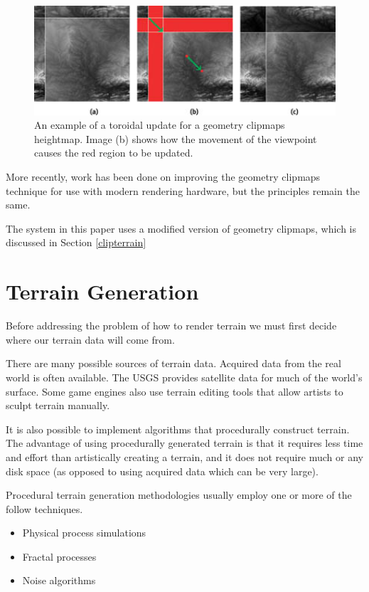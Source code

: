 \begin{figure}
	\centering
		\includegraphics[width=1.0\textwidth]{figures/clipmaps_update.jpg}
	\caption{
		An example of a toroidal update for a geometry clipmaps heightmap.
		Image (b) shows how the movement of the viewpoint causes the red region to be updated.
	}
	\label{fig:clipmaps_update}
\end{figure}

More recently, work has been done on improving the geometry clipmaps technique for use with modern rendering hardware, but the principles remain the same. \cite{gems_clipmaps}

The system in this paper uses a modified version of geometry clipmaps, which is discussed in Section \ref{clipterrain}

\section{Terrain Generation} \label{terrain_gen}

Before addressing the problem of how to render terrain we must first decide where our terrain data will come from.

There are many possible sources of terrain data.
Acquired data from the real world is often available.
The USGS provides satellite data for much of the world's surface.
Some game engines also use terrain editing tools that allow artists to sculpt terrain manually.

It is also possible to implement algorithms that procedurally construct terrain.
The advantage of using procedurally generated terrain is that it requires less time and effort  than artistically creating a terrain, and it does not require much or any disk space (as opposed to using acquired data which can be very large).

Procedural terrain generation methodologies usually employ one or more of the follow techniques.

\begin{itemize}
\item Physical process simulations
\item Fractal processes
\item Noise algorithms
\end{itemize}

